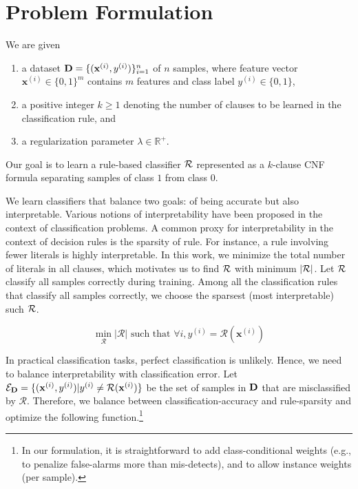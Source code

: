 

 \section{Problem Formulation}
 \label{interpretability_imli_sec:problem}
We are given 
\begin{enumerate}
	\item a dataset $ \mathbf{D} = \{(\mathbf{x}^{(i)}, y^{(i)})\}_{i=1}^n$ of $ n $ samples, where feature vector $ \mathbf{x}^{(i)} \in \{0, 1\}^m $ contains $ m $ features and class label $ y^{(i)} \in \{0,1\} $,
	\item a positive integer $ k \ge 1 $ denoting the number of clauses to be learned in the classification rule, and
	\item a regularization parameter $ \lambda \in \mathbb{R}^+ $.
\end{enumerate}
Our goal is to learn a rule-based classifier $ {\mathcal{R}} $ represented as a $ k $-clause CNF formula separating samples of class $ 1 $ from class $ 0 $. 
 
 

 We learn classifiers that balance two 
 goals: of  being accurate but also interpretable.  
 Various notions of interpretability have been proposed in the context of   classification problems. A common proxy for interpretability in the context of decision rules 
 is the sparsity of rule. For instance, a rule involving fewer literals is highly interpretable.  In this work, we minimize the total number of literals in all clauses, which motivates us to  find $ {\mathcal{R}}  $ with minimum  $ |{\mathcal{R}}| $. Let $ {\mathcal{R}} $ classify all samples correctly during training. Among all the classification rules that classify all samples correctly,  we choose the sparsest (most interpretable) such $ {\mathcal{R}} $. 
 
 

 \[
 \min\limits_{\mathcal{R}} |\mathcal{R}|\text{ such that }\forall i, y^{(i)}=\mathcal{R}(\mathbf{x}^{(i)})
 \]

 

 In practical classification tasks, perfect classification is unlikely. Hence, we need to balance interpretability with classification error.  Let $ \mathcal{E}_{\mathbf{D}} = \{(\mathbf{x}^{(i)},y^{(i)}) | y^{(i)} \ne \mathcal{R}(\mathbf{x}^{(i)}) \} $   be  the set of samples in $ \mathbf{D} $ that are misclassified  by $ \mathcal{R} $. Therefore, we balance between classification-accuracy and rule-sparsity and optimize the following function.\footnote{In our formulation, it is  straightforward to add class-conditional weights  (e.g., to penalize  false-alarms more than mis-detects), and to allow instance weights (per sample).}

